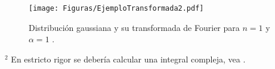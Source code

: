 \begin{ejemplo}
\begin{figure}[H]
    \centering
    \texttt{[image: Figuras/EjemploTransformada2.pdf]}
    \caption{Distribución gaussiana y su transformada de Fourier para $n=1$ y $\alpha =1$ .}
    \label{Espectro3}
\end{figure}
    \footnoterule
    
    {\footnotesize
    $^2$ En estricto rigor se debería calcular una integral compleja, vea \cite{Arfken}.
    }








\end{ejemplo}

